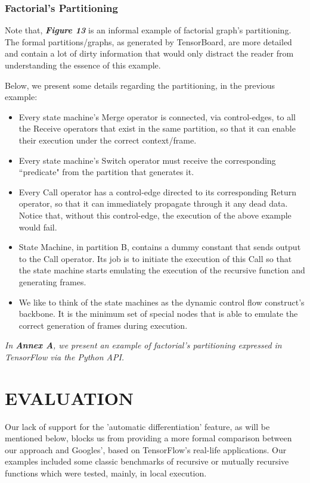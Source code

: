\documentclass[ack,preface]{dithesis}
\begin{document}
    \subsection{Factorial's Partitioning}

Note that, \textit{\textbf{Figure 13}} is an informal example of factorial graph's partitioning. The formal partitions/graphs, as generated by TensorBoard, are more detailed and contain a lot of dirty information that would only distract the reader from understanding the essence of this example.  

Below, we present some details regarding the partitioning, in the previous example:
    
\begin{itemize}
    \item Every state machine's Merge operator is connected, via control-edges, to all the Receive operators that exist in the same partition, so that it can enable their execution under the correct context/frame.
    \item Every state machine's Switch operator must receive the corresponding ``predicate" from the partition that generates it.
    \item Every Call operator has a control-edge directed to its corresponding Return operator, so that it can immediately propagate through it any dead data. Notice that, without this control-edge, the execution of the above example would fail.
    \item State Machine, in partition B, contains a dummy constant that sends output to the Call operator. Its job is to initiate the execution of this Call so that the state machine starts emulating the execution of the recursive function and generating frames.
    \item We like to think of  the state machines as the dynamic control flow construct's backbone. It is the minimum set of special nodes that  is able to emulate the correct generation of frames during execution.
    \end{itemize}

\textit{In \textbf{Annex A}, we present an example of factorial's partitioning expressed in TensorFlow via the Python API.}


\chapter{EVALUATION}

Our lack of support for the 'automatic differentiation' feature, as will be mentioned below, blocks us from providing a more formal comparison between our approach and Googles', based on TensorFlow's real-life applications. 
Our examples included some classic benchmarks of recursive or mutually recursive functions which were tested, mainly, in local execution.
\end{document}
